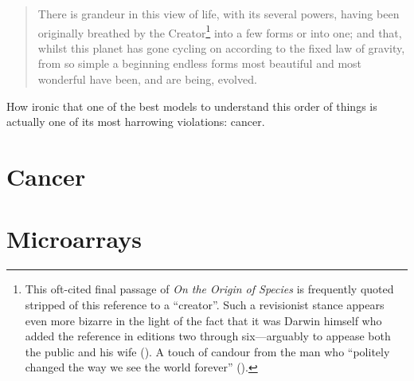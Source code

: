 \documentclass{tufte-book}
\begin{document}
\begin{quotation}
  There is grandeur in this view of life, with its several powers, having been
  originally breathed by the Creator\footnote{This \mbox{oft-cited} final
    passage of \emph{On the Origin of Species} is frequently quoted stripped of
    this reference to a ``creator''.  Such a revisionist stance appears even
    more bizarre in the light of the fact that it was Darwin himself who added
    the reference in editions two through six---arguably to appease both the
    public and his wife (\citealp{thompson_origin_2003}).  A touch of candour
    from the man who ``politely changed the way we see the world forever''
    (\citealp{rutherford_there_2008}).} into a few forms or into one; and that,
  whilst this planet has gone cycling on according to the fixed law of gravity,
  from so simple a beginning endless forms most beautiful and most wonderful
  have been, and are being, evolved.
\end{quotation}

How ironic that one of the best models to understand this order of things is
actually one of its most harrowing violations: cancer.\bigskip

\section{Cancer}

\bigskip

\section{Microarrays}

\backmatter



% 
% 
\end{document}
